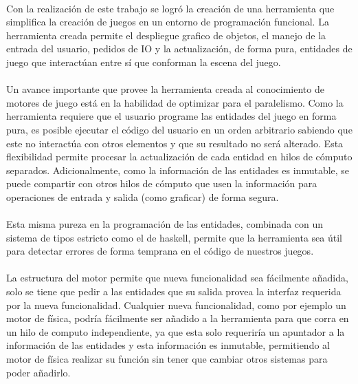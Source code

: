 \documentclass{standalone}
\begin{document}
\paragraph{}
Con la realización de este trabajo se logró la creación de una herramienta que simplifica la creación de juegos en un entorno de programación funcional. La herramienta creada permite el despliegue grafico de objetos, el manejo de la entrada del usuario, pedidos de IO y la actualización, de forma pura, entidades de juego que interactúan entre sí que conforman la escena del juego.

\paragraph{}
Un avance importante que provee la herramienta creada al conocimiento de motores de juego está en la habilidad de optimizar para el paralelismo. Como la herramienta requiere que el usuario programe las entidades del juego en forma pura, es posible ejecutar el código del usuario en un orden arbitrario sabiendo que este no interactúa con otros elementos y que su resultado no será alterado. Esta flexibilidad permite procesar la actualización de cada entidad en hilos de cómputo separados. Adicionalmente, como la información de las entidades es inmutable, se puede compartir con otros hilos de cómputo que usen la información para operaciones de entrada y salida (como graficar) de forma segura.

\paragraph{}
Esta misma pureza en la programación de las entidades, combinada con un sistema de tipos estricto como el de haskell, permite que la herramienta sea útil para detectar errores de forma temprana en el código de nuestros juegos.

\paragraph{}
La estructura del motor permite que nueva funcionalidad  sea fácilmente añadida, solo se tiene que pedir a las entidades que su salida provea la interfaz requerida por la nueva funcionalidad. Cualquier nueva funcionalidad, como por ejemplo un motor de física, podría fácilmente ser añadido a la herramienta para que corra en un hilo de computo independiente, ya que esta solo requeriría un apuntador a la información de las entidades y esta información es inmutable, permitiendo al motor de física realizar su función sin tener que cambiar otros sistemas para poder añadirlo.
\end{document}
